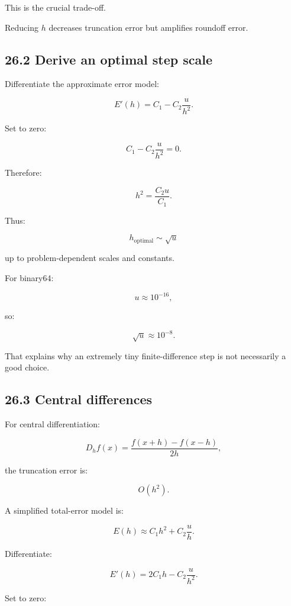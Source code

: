 This is the crucial trade-off.

Reducing \(h\) decreases truncation error but amplifies roundoff error.

\subsection{26.2 Derive an optimal step scale}\label{02-foundations-ii-ch029-derive-an-optimal-step-scale}

\hypertarget{02-foundations-ii-ch029-derive-an-optimal-step-scale}{}

Differentiate the approximate error model:

\[ E'(h)=C_1-C_2\frac u{h^2}. \]

Set to zero:

\[ C_1-C_2\frac u{h^2}=0. \]

Therefore:

\[ h^2=\frac{C_2u}{C_1}. \]

Thus:

\[ \boxed{ h_{\mathrm{optimal}} \sim\sqrt u } \]

up to problem-dependent scales and constants.

For binary64:

\[ u\approx10^{-16}, \]

so:

\[ \sqrt u\approx10^{-8}. \]

That explains why an extremely tiny finite-difference step is not necessarily a good choice.

\subsection{26.3 Central differences}\label{02-foundations-ii-ch029-central-differences}

\hypertarget{02-foundations-ii-ch029-central-differences}{}

For central differentiation:

\[ D_hf(x)= \frac{f(x+h)-f(x-h)}{2h}, \]

the truncation error is:

\[ O(h^2). \]

A simplified total-error model is:

\[ \boxed{ E(h)\approx C_1h^2+C_2\frac uh }. \]

Differentiate:

\[ E'(h)=2C_1h-C_2\frac u{h^2}. \]

Set to zero:

